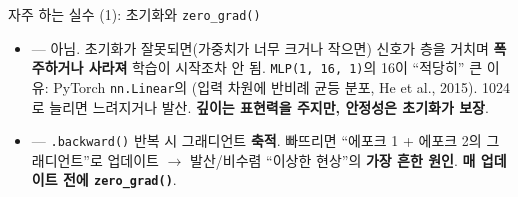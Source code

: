 \begin{frame}{자주 하는 실수 (1): 초기화와 \texttt{zero\_grad()}}
  \begin{itemize}
    \item {} --- 아님.
      초기화가 잘못되면(가중치가 너무 크거나 작으면) 신호가 층을 거치며
      \textbf{폭주하거나 사라져} 학습이 시작조차 안 됨.
      \texttt{MLP(1, 16, 1)}의 16이 ``적당히'' 큰 이유: PyTorch
      \texttt{nn.Linear}의 (입력 차원에 반비례 균등
      분포, He et al., 2015). 1024로 늘리면 느려지거나 발산.
      \textbf{깊이는 표현력을 주지만, 안정성은 초기화가 보장}.
    \item {} ---
      \texttt{.backward()} 반복 시 그래디언트 \textbf{축적}.
      빠뜨리면 ``에포크 1 + 에포크 2의 그래디언트''로 업데이트 $\to$
      발산/비수렴 ``이상한 현상''의 \textbf{가장 흔한 원인}.
      \textbf{매 업데이트 전에 \texttt{zero\_grad()}}.
  \end{itemize}
\end{frame}
